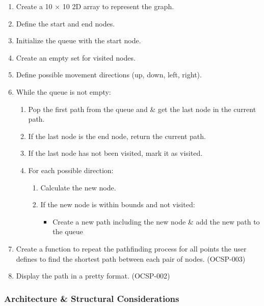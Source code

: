 \begin{enumerate}
    \item Create a 10 $\times$ 10 2D array to represent the graph.
    \item Define the start and end nodes.
    \item Initialize the queue with the start node.
    \item Create an empty set for visited nodes.
    \item Define possible movement directions (up, down, left, right).
    \item While the queue is not empty:
        \begin{enumerate}
            \item Pop the first path from the queue and \& get the last node in the current path.
            \item If the last node is the end node, return the current path.
            \item If the last node has not been visited, mark it as visited.
            \item For each possible direction:
                \begin{enumerate}
                    \item Calculate the new node.
                    \item If the new node is within bounds and not visited:
                        \begin{itemize}
                            \item Create a new path including the new node \& add the new path to the queue
                        \end{itemize}
                \end{enumerate}
        \end{enumerate}
    \item Create a function to repeat the pathfinding process for all points the user defines to find the shortest path between each pair of nodes. (OCSP-003)
    \item Display the path in a pretty format. (OCSP-002)
\end{enumerate}

\newpage


\subsubsection{Architecture \& Structural Considerations}

